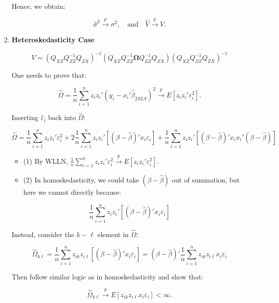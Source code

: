 \documentclass[12pt, oneside]{article}
\begin{document}
\begin{enumerate}
Hence, we obtain:

\[
\hat{\sigma}^2 \xrightarrow{p} \sigma^2, \quad \text{and} \quad \hat{V} \xrightarrow{p} V.
\]

\item \textbf{Heteroskedasticity Case}

\[
V = (Q_{XZ} Q_{ZZ}^{-1} Q_{ZX})^{-1} (Q_{XZ} Q_{ZZ}^{-1} \mathbf{\Omega} Q_{ZZ}^{-1} Q_{ZX}) (Q_{XZ} Q_{ZZ}^{-1} Q_{ZX})^{-1}
\]

One needs to prove that:

\[
\hat{\Omega} = \frac{1}{n} \sum_{i=1}^{n} z_i z_i' (y_i - x_i' \hat{\beta}_{2SLS})^2 \xrightarrow{p} E[z_i z_i' \varepsilon_i^2].
\]

Inserting \( \hat{\varepsilon}_i \) back into \( \hat{\Omega} \):

\[
\hat{\Omega} = \frac{1}{n} \sum_{i=1}^{n} z_i z_i' \varepsilon_i^2 + 2 \frac{1}{n} \sum_{i=1}^{n} z_i z_i' [( \beta - \hat{\beta})' x_i \varepsilon_i] + \frac{1}{n} \sum_{i=1}^{n} z_i z_i' [( \beta - \hat{\beta})' x_i x_i' ( \beta - \hat{\beta})]
\]

\begin{itemize}
    \item (1) By WLLN, \( \frac{1}{n} \sum_{i=1}^{n} z_i z_i' \varepsilon_i^2 \xrightarrow{p} E[z_i z_i' \varepsilon_i^2] \).
    \item (2) In homoskedasticity, we could take \( (\beta - \hat{\beta}) \) out of summation, but here we cannot directly because:
\end{itemize}

\[
\frac{1}{n} \sum_{i=1}^{n} z_i z_i' \left[ (\beta - \hat{\beta})' x_i \varepsilon_i \right]
\]

Instead, consider the \( k - \ell \) element in \( \hat{\Omega} \):

\[
\hat{\Omega}_{k\ell} = \frac{1}{n} \sum_{i=1}^{n} z_{ik} z_{i\ell} [(\beta - \hat{\beta})' x_i \varepsilon_i] = (\beta - \hat{\beta})' \frac{1}{n} \sum_{i=1}^{n} z_{ik} z_{i\ell} x_i \varepsilon_i
\]

Then follow similar logic as in homoskedasticity and show that:

\[
\hat{\Omega}_{k\ell} \xrightarrow{p} E[z_{ik} z_{i\ell} x_i \varepsilon_i] < \infty.
\]
\end{enumerate}
\end{document}
